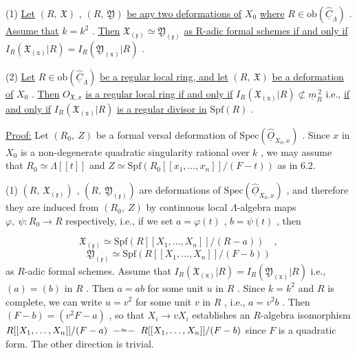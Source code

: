 (1)  \underline{Let}  $(R,\ \mathfrak{X})$ ,  $(R,\ \mathfrak{Y})$  \underline{be any two deformations of}  $X_0$  \underline{where} $R \in \mathrm{ob}(\hat{\underline{C}}_{\Lambda})$  . \underline{Assume that}  $k = k^2$  . \underline{Then}  $\mathfrak{X}_{(\mathfrak{x})} \simeq \mathfrak{Y}_{(\mathfrak{x})}$  \underline{as R-adic formal schemes if and only if}  $I_R(\mathfrak{X}_{(\mathrm{x})}|R) = I_R(\mathfrak{Y}_{(\mathrm{x})}|R)$  .

(2)  \underline{Let}  $R \in \mathrm{ob}(\hat{\underline{C}}_{\Lambda})$  \underline{be a regular local ring, and let}  $(R,\ \mathfrak{X})$  \underline{be a deformation of}  $X_0$  . \underline{Then}  $O_{\mathfrak{X},x}$  \underline{is a regular local ring if and only if} $I_R(\mathfrak{X}_{(\mathrm{x})}|R) \not\subset \underline{m}_R^{\,2}$  i.e., \underline{if and only if}  $I_R(\mathfrak{X}_{(\mathrm{x})}|R)$  \underline{is a regular divisor in} $\mathrm{Spf}(R)$  .

\underline{Proof:}  Let  $(R_0,\ Z)$  be a formal versal deformation of  $\mathrm{Spec}(\hat{\underline{O}}_{X_0,x})$  . Since  $x$ in  $X_0$  is a non-degenerate quadratic singularity rational over  $k$  , we may assume that  $R_0 \simeq \Lambda[[t]]$  and  $Z \simeq \mathrm{Spf}(R_0[[x_1,\dots,x_n]]/(F - t))$  as in 6.2.

(1)  $(R,\ \mathfrak{X}_{(\mathfrak{x})})$ ,  $(R,\ \mathfrak{Y}_{(\mathfrak{x})})$  are deformations of  $\mathrm{Spec}(\hat{\underline{O}}_{X_0,x})$  , and therefore they are induced from  $(R_0,\ Z)$  by continuous local $\Lambda$-algebra maps $\varphi,\ \psi : R_0 \rightarrow R$  respectively, i.e., if we set  $a = \varphi(t)$  ,  $b = \psi(t)$  , then

\begin{equation*}
\mathfrak{X}_{(\mathfrak{x})} \simeq \mathrm{Spf}(R[[X_1,\dots,X_n]]/(R - a)) \quad ,
\end{equation*}
\begin{equation*}
\mathfrak{Y}_{(\mathfrak{x})} \simeq \mathrm{Spf}(R[[X_1,\dots,X_n]]/(F - b))
\end{equation*}
as $R$-adic formal schemes. Assume that  $I_R(\mathfrak{X}_{(\mathrm{x})}|R) = I_R(\mathfrak{Y}_{(\mathrm{x})}|R)$  i.e.,
$(a) = (b)$ in $R$ . Then $a = ab$ for some unit $u$ in $R$ . Since $k = k^2$ and $R$ is complete, we can write $u = v^2$ for some unit $v$ in $R$ , i.e., $a = v^2b$ . Then $(F - b) = (v^2F - a)$ , so that $X_i \to vX_i$ establishes an $R$-algebra isomorphism $R[[X_1,\ldots,X_n]]/(F - a) \;\overset{\sim}{\relbar\relbar\relbar}\; R[[X_1,\ldots,X_n]]/(F - b)$ since $F$ is a quadratic form. The other direction is trivial.


